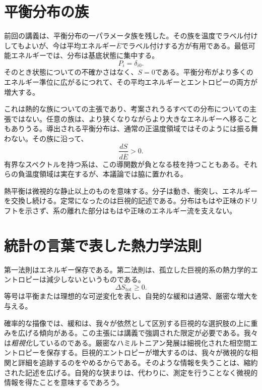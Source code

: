 \section{平衡分布の族}

前回の講義は、平衡分布の一パラメータ族を残した。その族を温度でラベル付けしてもよいが、今は平均エネルギー\(\overline E\)でラベル付けする方が有用である。最低可能エネルギーでは、分布は基底状態に集中する。
\[
 P_i=\delta_{i0}.
\]
そのとき状態についての不確かさはなく、\(S=0\)である。平衡分布がより多くのエネルギー準位に広がるにつれて、その平均エネルギーとエントロピーの両方が増大する。

これは熱的な族についての主張であり、考案されうるすべての分布についての主張ではない。任意の族は、より狭くなりながらより大きなエネルギーへ移ることもありうる。導出される平衡分布は、通常の正温度領域ではそのようには振る舞わない。その族に沿って、
\begin{equation}
 \frac{dS}{d\overline E}>0.
 \label{eq:sm3-positive-temperature-branch}
\end{equation}
有界なスペクトルを持つ系は、この導関数が負となる枝を持つこともある。それらの負温度領域は実在するが、本議論では脇に置かれる。

熱平衡は微視的な静止以上のものを意味する。分子は動き、衝突し、エネルギーを交換し続ける。定常になったのは巨視的記述である。分布はもはや正味のドリフトを示さず、系の離れた部分はもはや正味のエネルギー流を支えない。

\section{統計の言葉で表した熱力学法則}

第一法則はエネルギー保存である。第二法則は、孤立した巨視的系の熱力学的エントロピーは減少しないというものである。
\begin{equation}
 \Delta S_{\mathrm{tot}}\geq0.
 \label{eq:sm3-second-law}
\end{equation}
等号は平衡または理想的な可逆変化を表し、自発的な緩和は通常、厳密な増大を与える。

確率的な描像では、緩和は、我々が依然として区別する巨視的な選択肢の上に重みを広げる傾向がある。この主張には講義で強調された限定が必要である。我々は\emph{粗視化}しているのである。厳密なハミルトニアン発展は細視化された相空間エントロピーを保存する。巨視的エントロピーが増大するのは、我々が微視的な相関と詳細を追跡するのをやめるからである。そのような情報を失うことは、縮約された記述を広げる。自発的な狭まりは、代わりに、測定を行うことなく微視的情報を得たことを意味するであろう。

